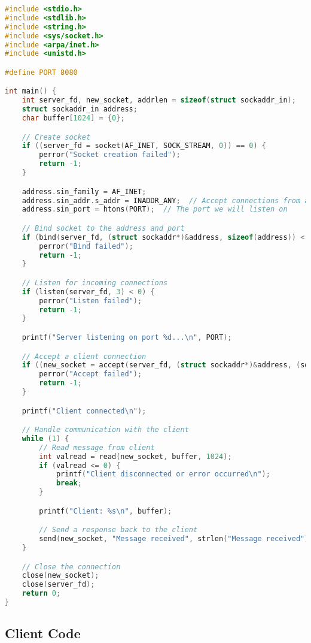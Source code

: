 \documentclass[12pt]{article}
\begin{document}
\begin{lstlisting}[language=C, caption={Server Code for Client-Server Communication}]
#include <stdio.h>
#include <stdlib.h>
#include <string.h>
#include <sys/socket.h>
#include <arpa/inet.h>
#include <unistd.h>

#define PORT 8080

int main() {
    int server_fd, new_socket, addrlen = sizeof(struct sockaddr_in);
    struct sockaddr_in address;
    char buffer[1024] = {0};

    // Create socket
    if ((server_fd = socket(AF_INET, SOCK_STREAM, 0)) == 0) {
        perror("Socket creation failed");
        return -1;
    }

    address.sin_family = AF_INET;
    address.sin_addr.s_addr = INADDR_ANY;  // Accept connections from any IP address
    address.sin_port = htons(PORT);  // The port we will listen on

    // Bind socket to the address and port
    if (bind(server_fd, (struct sockaddr*)&address, sizeof(address)) < 0) {
        perror("Bind failed");
        return -1;
    }

    // Listen for incoming connections
    if (listen(server_fd, 3) < 0) {
        perror("Listen failed");
        return -1;
    }

    printf("Server listening on port %d...\n", PORT);

    // Accept a client connection
    if ((new_socket = accept(server_fd, (struct sockaddr*)&address, (socklen_t*)&addrlen)) < 0) {
        perror("Accept failed");
        return -1;
    }

    printf("Client connected\n");

    // Handle communication with the client
    while (1) {
        // Read message from client
        int valread = read(new_socket, buffer, 1024);
        if (valread <= 0) {
            printf("Client disconnected or error occurred\n");
            break;
        }

        printf("Client: %s\n", buffer);

        // Send a response back to the client
        send(new_socket, "Message received", strlen("Message received"), 0);
    }

    // Close the connection
    close(new_socket);
    close(server_fd);
    return 0;
}

\end{lstlisting}



\subsection{Client Code}
\end{document}
